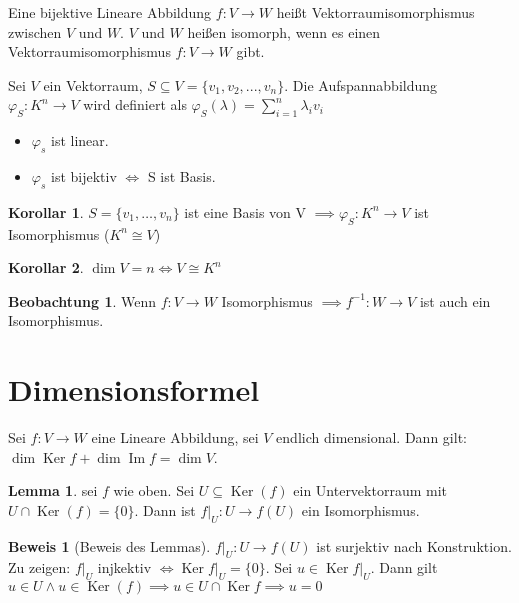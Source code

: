 \documentclass[fontsize=11pt,paper=a4,BCOR=0mm,DIV=11,automark,headsepline]{scrbook}
\DeclareMathOperator{\mdim}{dim}
\DeclareMathOperator{\mKer}{Ker}
\DeclareMathOperator{\mIm}{Im}
\theoremstyle{remark}
\theoremstyle{definition}
\newtheorem{beobachtung}{Beobachtung}
\newtheorem{lemma}{Lemma}[section]
\newtheorem*{korollar}{Korollar}
\theoremstyle{proof}
\newtheorem*{prof}{Beweis}
\theoremstyle{remark}
\begin{document}
\begin{definition}{}{}
Eine bijektive Lineare Abbildung \(f:V\rightarrow W\) heißt Vektorraumisomorphismus
zwischen \(V\) und \(W\). \(V\) und \(W\) heißen isomorph, wenn es einen
Vektorraumisomorphismus \(f: V\rightarrow W\) gibt.
\end{definition}

\begin{exa} \label{}
Sei \(V\) ein Vektorraum, \(S\subseteq V = \{v_1, v_2, ..., v_n\}\). Die
Aufspannabbildung $\varphi_S: K^n \rightarrow V$ wird definiert als $\varphi_S(\lambda)=\sum_{i=1}^{n}\lambda_i v_i$

\begin{itemize}
	\item \(\varphi_s\) ist linear.
	\item \(\varphi_s\) ist bijektiv \(\iff\) S ist Basis.
\end{itemize}
\end{exa}

\begin{korollar}
	\(S=\{v_1,\ldots,v_n\}\) ist eine Basis von V $\implies \varphi_S: K^n \rightarrow V$ ist Isomorphismus ($K^n\cong V$)
\end{korollar}

\begin{korollar}
	\(\dim V = n \iff V\cong K^n\)
\end{korollar}

\begin{beobachtung}
	Wenn \(f:V\rightarrow W\) Isomorphismus $\implies f^{-1}:W\rightarrow V $ ist auch ein Isomorphismus.
\end{beobachtung}

\section{Dimensionsformel}
\label{sec:org9a58004}
\begin{theo}{}{}
Sei \(f:V\to W\) eine Lineare Abbildung, sei \(V\) endlich dimensional. Dann gilt: \(\mdim\mKer f + \mdim\mIm f = \mdim V\).
\end{theo}

\begin{lemma} sei \(f\) wie oben. Sei \(U \subseteq \mKer(f)\) ein Untervektorraum mit \(U \cap \mKer(f) = \{0\}\).  Dann ist \(f|_U:U\to f(U)\) ein Isomorphismus.
\end{lemma}

\begin{prof}[Beweis des Lemmas] \label{}
\(f|_U:U\to f(U)\) ist surjektiv nach Konstruktion. Zu zeigen: \(f|_U\) injkektiv \(\iff \mKer f|_U = \{0\}\). Sei \(u\in \mKer f|_U \). Dann gilt \(u\in U \land u \in \mKer(f) \implies u \in U \cap \mKer f \implies u = 0\)
\end{prof}
\end{document}
